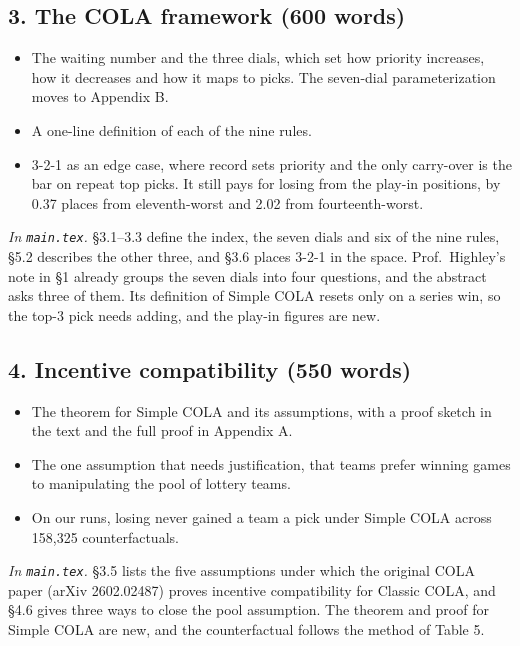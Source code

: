 \documentclass[10pt]{article}
\newcommand{\inmain}[1]{\textit{In \texttt{main.tex}.} #1\par}
\begin{document}
\subsection{3. The COLA framework (600 words)}
\begin{itemize}
\item The waiting number and the three dials, which set how priority increases, how it decreases and how it maps to picks. The seven-dial parameterization moves to Appendix B.
\item A one-line definition of each of the nine rules.
\item 3-2-1 as an edge case, where record sets priority and the only carry-over is the bar on repeat top picks. It still pays for losing from the play-in positions, by 0.37 places from eleventh-worst and 2.02 from fourteenth-worst.
\end{itemize}
\inmain{\S3.1--3.3 define the index, the seven dials and six of the nine rules, \S5.2 describes the other three, and \S3.6 places 3-2-1 in the space. Prof.\ Highley's note in \S1 already groups the seven dials into four questions, and the abstract asks three of them. Its definition of Simple COLA resets only on a series win, so the top-3 pick needs adding, and the play-in figures are new.}

\subsection{4. Incentive compatibility (550 words)}
\begin{itemize}
\item The theorem for Simple COLA and its assumptions, with a proof sketch in the text and the full proof in Appendix A.
\item The one assumption that needs justification, that teams prefer winning games to manipulating the pool of lottery teams.
\item On our runs, losing never gained a team a pick under Simple COLA across 158{,}325 counterfactuals.
\end{itemize}
\inmain{\S3.5 lists the five assumptions under which the original COLA paper (arXiv 2602.02487) proves incentive compatibility for Classic COLA, and \S4.6 gives three ways to close the pool assumption. The theorem and proof for Simple COLA are new, and the counterfactual follows the method of Table 5.}
\end{document}
